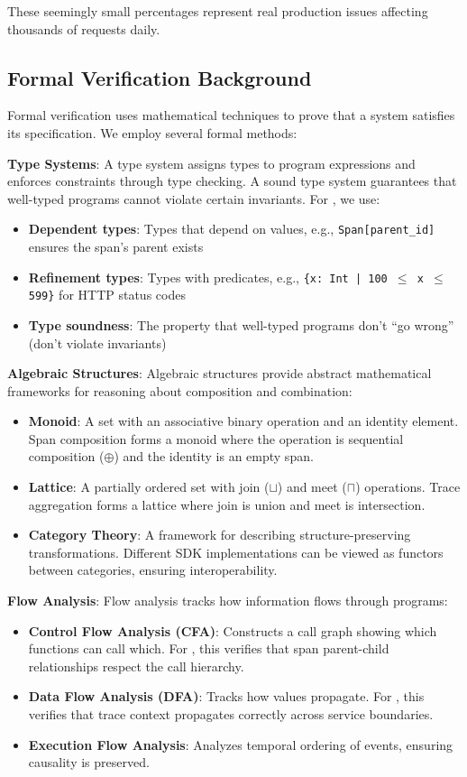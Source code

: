 These seemingly small percentages represent real production issues affecting thousands of requests daily.

\subsection{Formal Verification Background}
\label{sec:background-formal}

Formal verification uses mathematical techniques to prove that a system satisfies its specification. We employ several formal methods:

\textbf{Type Systems}: A type system assigns types to program expressions and enforces constraints through type checking. A sound type system guarantees that well-typed programs cannot violate certain invariants. For \otlp, we use:
\begin{itemize}
\item \textbf{Dependent types}: Types that depend on values, e.g., \texttt{Span[parent\_id]} ensures the span's parent exists
\item \textbf{Refinement types}: Types with predicates, e.g., \texttt{\{x: Int | 100 $\leq$ x $\leq$ 599\}} for HTTP status codes
\item \textbf{Type soundness}: The property that well-typed programs don't ``go wrong'' (don't violate invariants)
\end{itemize}

\textbf{Algebraic Structures}: Algebraic structures provide abstract mathematical frameworks for reasoning about composition and combination:
\begin{itemize}
\item \textbf{Monoid}: A set with an associative binary operation and an identity element. Span composition forms a monoid where the operation is sequential composition ($\oplus$) and the identity is an empty span.
\item \textbf{Lattice}: A partially ordered set with join ($\sqcup$) and meet ($\sqcap$) operations. Trace aggregation forms a lattice where join is union and meet is intersection.
\item \textbf{Category Theory}: A framework for describing structure-preserving transformations. Different \otlp SDK implementations can be viewed as functors between categories, ensuring interoperability.
\end{itemize}

\textbf{Flow Analysis}: Flow analysis tracks how information flows through programs:
\begin{itemize}
\item \textbf{Control Flow Analysis (CFA)}: Constructs a call graph showing which functions can call which. For \otlp, this verifies that span parent-child relationships respect the call hierarchy.
\item \textbf{Data Flow Analysis (DFA)}: Tracks how values propagate. For \otlp, this verifies that trace context propagates correctly across service boundaries.
\item \textbf{Execution Flow Analysis}: Analyzes temporal ordering of events, ensuring causality is preserved.
\end{itemize}

